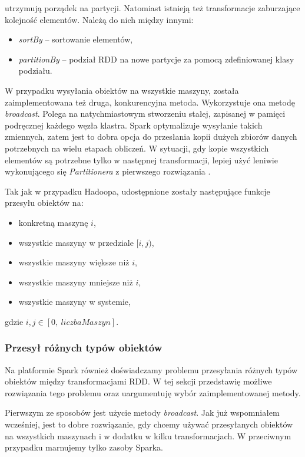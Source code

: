 \documentclass[magisterska]{pracamgr}
\begin{document}
 utrzymują porządek na partycji. Natomiast istnieją też transformacje zaburzające kolejność elementów. Należą do nich między innymi:
 \begin{itemize}
     \item \textit{sortBy} -- sortowanie elementów,
     \item \textit{partitionBy} -- podział RDD na nowe partycje za pomocą zdefiniowanej klasy podziału.
 \end{itemize}

W przypadku wysyłania obiektów na wszystkie maszyny, została zaimplementowana też druga, konkurencyjna metoda. Wykorzystuje ona metodę \textit{broadcast}. Polega na natychmiastowym stworzeniu stałej, zapisanej w pamięci podręcznej każdego węzła klastra. Spark optymalizuje wysyłanie takich zmiennych, zatem jest to dobra opcja do przesłania kopii dużych zbiorów danych potrzebnych na wielu etapach obliczeń. W sytuacji, gdy kopie wszystkich elementów są potrzebne tylko w następnej transformacji, lepiej użyć leniwie wykonującego się \textit{Partitionera} z pierwszego rozwiązania \cite{spark_documentation}.

Tak jak w przypadku Hadoopa, udostępnione zostały następujące funkcje przesyłu obiektów na:
\begin{itemize}
    \item konkretną maszynę \(i\),
    \item wszystkie maszyny w przedziale \([i, j)\),
    \item wszystkie maszyny większe niż \(i\),
    \item wszystkie maszyny mniejsze niż \(i\),
    \item wszystkie maszyny w systemie,
\end{itemize}

gdzie \(i, j \in [0, \ liczbaMaszyn]\).

\subsubsection{Przesył różnych typów obiektów} \label{spark_przesyl_obiektow}

Na platformie Spark również doświadczamy problemu przesyłania różnych typów obiektów między transformacjami RDD. W tej sekcji przedstawię możliwe rozwiązania tego problemu oraz uargumentuję wybór zaimplementowanej metody.

Pierwszym ze sposobów jest użycie metody \textit{broadcast}. Jak już wspomniałem wcześniej, jest to dobre rozwiązanie, gdy chcemy używać przesyłanych obiektów na wszystkich maszynach i w dodatku w kilku transformacjach. W przeciwnym przypadku marnujemy tylko zasoby Sparka.
\end{document}
